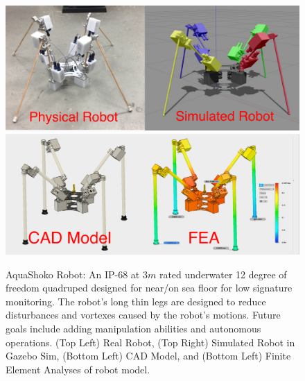 \begin{figure}[!t]
\centering
\includegraphics[width=1.0\columnwidth]{./img/aquashoko-2.pdf}
\includegraphics[width=1.0\columnwidth]{./img/aquaShoko-fea-cad.pdf}
\caption{AquaShoko Robot: An IP-68 at 3$m$ rated underwater 12 degree of freedom quadruped designed for near/on sea floor for low signature monitoring.  The robot's long thin legs are designed to reduce disturbances and vortexes caused by the robot's motions. Future goals include adding manipulation abilities and autonomous operations. (Top Left) Real Robot, (Top Right) Simulated Robot in Gazebo Sim, (Bottom Left) CAD Model, and (Bottom Left) Finite Element Analyses of robot model. }
\label{fig:cover}
\end{figure}